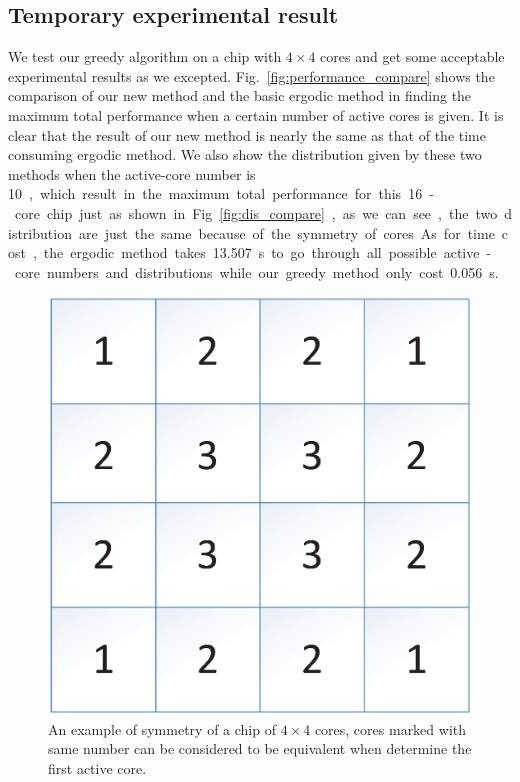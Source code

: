 \subsection{Temporary experimental result}
We test our greedy algorithm on a chip with $4 \times 4$ cores and get some acceptable experimental results as we
excepted. Fig.~\ref{fig:performance_compare} shows the comparison of our new method and the basic ergodic method in finding the maximum total
performance when a certain number of active cores is given. It is clear that the result of our new method is nearly the
same as that of the time consuming ergodic method. We also show the distribution given by these two methods when the
active-core number is \SI{10}, which result in the maximum total performance for this 16-core chip just as shown in
Fig.~\ref{fig:dis_compare}, as we can see, the two distribution are just the same because of the symmetry of cores.
As for time cost, the ergodic method takes \SI{13.507}s to go through all possible active-core numbers and distributions
while our greedy method only cost \SI{0.056}s.

\begin{figure}
\centering
\includegraphics[width=0.7\columnwidth]{fig/symmetry.eps}
\caption{An example of symmetry of a chip of $4 \times 4$ cores, cores marked with same number can be considered to be equivalent
when determine the first active core.
}
\label{fig:symmetry}
\end{figure}

